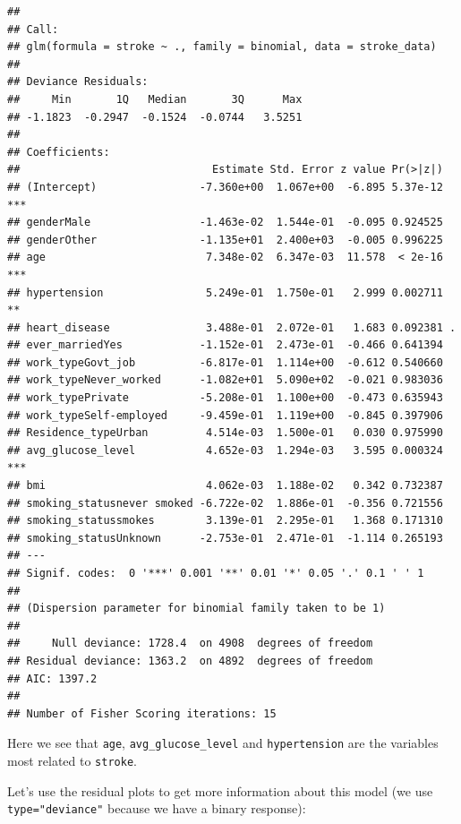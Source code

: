 \documentclass[
]{article}
\begin{document}
\begin{verbatim}
## 
## Call:
## glm(formula = stroke ~ ., family = binomial, data = stroke_data)
## 
## Deviance Residuals: 
##     Min       1Q   Median       3Q      Max  
## -1.1823  -0.2947  -0.1524  -0.0744   3.5251  
## 
## Coefficients:
##                              Estimate Std. Error z value Pr(>|z|)    
## (Intercept)                -7.360e+00  1.067e+00  -6.895 5.37e-12 ***
## genderMale                 -1.463e-02  1.544e-01  -0.095 0.924525    
## genderOther                -1.135e+01  2.400e+03  -0.005 0.996225    
## age                         7.348e-02  6.347e-03  11.578  < 2e-16 ***
## hypertension                5.249e-01  1.750e-01   2.999 0.002711 ** 
## heart_disease               3.488e-01  2.072e-01   1.683 0.092381 .  
## ever_marriedYes            -1.152e-01  2.473e-01  -0.466 0.641394    
## work_typeGovt_job          -6.817e-01  1.114e+00  -0.612 0.540660    
## work_typeNever_worked      -1.082e+01  5.090e+02  -0.021 0.983036    
## work_typePrivate           -5.208e-01  1.100e+00  -0.473 0.635943    
## work_typeSelf-employed     -9.459e-01  1.119e+00  -0.845 0.397906    
## Residence_typeUrban         4.514e-03  1.500e-01   0.030 0.975990    
## avg_glucose_level           4.652e-03  1.294e-03   3.595 0.000324 ***
## bmi                         4.062e-03  1.188e-02   0.342 0.732387    
## smoking_statusnever smoked -6.722e-02  1.886e-01  -0.356 0.721556    
## smoking_statussmokes        3.139e-01  2.295e-01   1.368 0.171310    
## smoking_statusUnknown      -2.753e-01  2.471e-01  -1.114 0.265193    
## ---
## Signif. codes:  0 '***' 0.001 '**' 0.01 '*' 0.05 '.' 0.1 ' ' 1
## 
## (Dispersion parameter for binomial family taken to be 1)
## 
##     Null deviance: 1728.4  on 4908  degrees of freedom
## Residual deviance: 1363.2  on 4892  degrees of freedom
## AIC: 1397.2
## 
## Number of Fisher Scoring iterations: 15
\end{verbatim}

Here we see that \texttt{age}, \texttt{avg\_glucose\_level} and
\texttt{hypertension} are the variables most related to \texttt{stroke}.

Let's use the residual plots to get more information about this model
(we use \texttt{type="deviance"} because we have a binary response):
\end{document}
